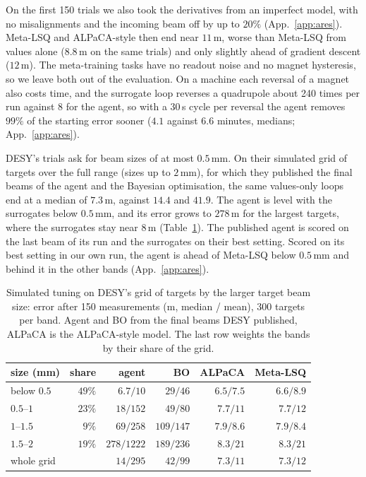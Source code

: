 \documentclass[fullpaper,final]{nldl}
\theoremstyle{plain}
\theoremstyle{definition}
\begin{document}
On the first 150 trials we also took the derivatives from an imperfect model, with
no misalignments and the incoming beam off by up to $20\%$ (App.~\ref{app:ares}).
Meta-LSQ and ALPaCA-style then end near $11$\,\textmu m, worse than Meta-LSQ from
values alone ($8.8$\,\textmu m on the same trials) and only slightly ahead of gradient
descent ($12$\,\textmu m). The meta-training tasks have
no readout noise and no magnet hysteresis, so we leave both out of the evaluation.
On a machine each reversal of a magnet also costs time, and the surrogate loop
reverses a quadrupole about 240 times per run against 8 for the agent, so with a
30\,s cycle per reversal the agent removes $99\%$ of the starting error sooner
($4.1$ against $6.6$ minutes, medians; App.~\ref{app:ares}).

DESY's trials ask for beam sizes of at most $0.5$\,mm. On their simulated grid of
targets over the full range (sizes up to $2$\,mm), for which they published the
final beams of the agent and the Bayesian optimisation, the same values-only loops
end at a median of $7.3$\,\textmu m, against $14.4$ and $41.9$. The agent is level with the surrogates below $0.5$\,mm, and its
error grows to $278$\,\textmu m for the largest targets, where the surrogates stay near
$8$\,\textmu m (Table~\ref{tab:ares-grid}). The published agent is scored on the last
beam of its run and the surrogates on their best setting. Scored on its best setting
in our own run, the agent is ahead of Meta-LSQ below $0.5$\,mm and behind it in the
other bands (App.~\ref{app:ares}).

\begin{table}[tb]
\centering
\caption{Simulated tuning on DESY's grid of targets by the larger target beam size:
error after 150 measurements (\textmu m, median / mean), 300 targets per band.
Agent and BO from the final beams DESY published, ALPaCA is the ALPaCA-style
model. The last row weights the bands by their share of the grid.}
\label{tab:ares-grid}
\scriptsize
\setlength{\tabcolsep}{3pt}
\begin{tabular}{lrrrrr}
\toprule
size (mm) & share & agent & BO & ALPaCA & Meta-LSQ \\
\midrule
below $0.5$ & $49\%$ & $6.7/10$   & $29/46$   & $6.5/7.5$ & $6.6/8.9$ \\
$0.5$--$1$  & $23\%$ & $18/152$   & $49/80$   & $7.7/11$  & $7.7/12$ \\
$1$--$1.5$  & $9\%$  & $69/258$   & $109/147$ & $7.9/8.6$ & $7.9/8.4$ \\
$1.5$--$2$  & $19\%$ & $278/1222$ & $189/236$ & $8.3/21$  & $8.3/21$ \\
\midrule
whole grid  &        & $14/295$   & $42/99$   & $7.3/11$  & $7.3/12$ \\
\bottomrule
\end{tabular}
\end{table}
\end{document}
